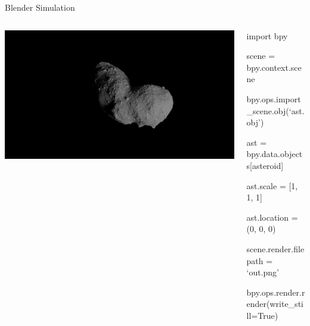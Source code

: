 \documentclass[11pt,professionalfonts]{beamer}
\begin{document}
\begin{frame}[fragile]{Blender Simulation}
{\begin{columns}
\begin{column}{0.5\textwidth}
        \includegraphics[width=\columnwidth]{figures/itokawa_blender.png}
        \end{column}
        \begin{column}{0.5\textwidth}
            \scriptsize
            \begin{semiverbatim}
            import bpy
    

            scene = bpy.context.scene

            bpy.ops.import\_scene.obj(`ast.obj')

            ast = bpy.data.objects[asteroid]


            ast.scale = [1, 1, 1] 

            ast.location = (0, 0, 0)
          

            scene.render.filepath = `out.png'

            bpy.ops.render.render(write\_still=True)

            \end{semiverbatim}
        \end{column}
    \end{columns}
}
\end{frame}
\end{document}
